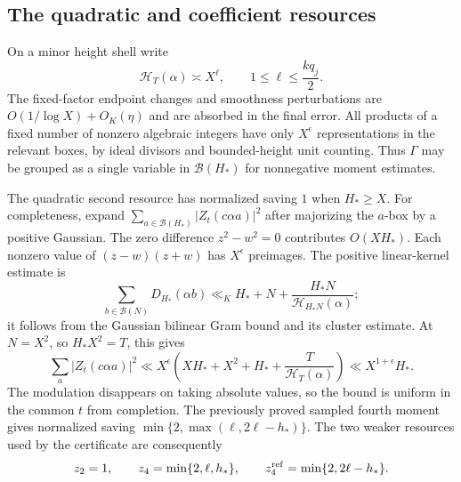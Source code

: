 \documentclass[11pt,reqno]{amsart}
\numberwithin{equation}{section}
\theoremstyle{definition}
\begin{document}
\subsection{The quadratic and coefficient resources}

On a minor height shell write
\[
 \mathcal H_T(\alpha)\asymp X^\ell,
 \qquad 1\le\ell\le\frac{kq_j}{2}.
\]
The fixed-factor endpoint changes and smoothness perturbations are
$O(1/\log X)+O_K(\eta)$ and are absorbed in the final error.
All products of a fixed number of nonzero algebraic integers have only
$X^\epsilon$ representations in the relevant boxes, by ideal divisors
and bounded-height unit counting. Thus $\Gamma$ may be grouped as a single
variable in $\mathcal B(H_*)$ for nonnegative moment estimates.

The quadratic second resource has normalized saving $1$ when $H_*\ge X$.
For completeness, expand
$\sum_{a\in\mathcal B(H_*)}|Z_t(c\alpha a)|^2$ after majorizing the
$a$-box by a positive Gaussian. The zero difference $z^2-w^2=0$ contributes
$O(XH_*)$. Each nonzero value of $(z-w)(z+w)$ has $X^\epsilon$ preimages.
The positive linear-kernel estimate is
\[
 \sum_{b\in\mathcal B(N)}D_{H_*}(\alpha b)
 \ll_K H_*+N+\frac{H_*N}{\mathcal H_{H_*N}(\alpha)};
\]
it follows from the Gaussian bilinear Gram bound and its cluster estimate.
At $N=X^2$, so $H_*X^2=T$, this gives
\[
 \sum_a|Z_t(c\alpha a)|^2
 \ll X^\epsilon\left(XH_*+X^2+H_*+\frac{T}{\mathcal H_T(\alpha)}\right)
 \ll X^{1+\epsilon}H_*.
\]
The modulation disappears on taking absolute values, so the bound is uniform
in the common $t$ from completion. The previously proved sampled fourth
moment gives normalized saving
$\min\{2,\max(\ell,2\ell-h_*)\}$.
The two weaker resources used by the certificate are consequently
\[
 z_2=1,\qquad z_4=\min\{2,\ell,h_*\},\qquad
 z_4^{\rm ref}=\min\{2,2\ell-h_*\}.
\]
\end{document}
